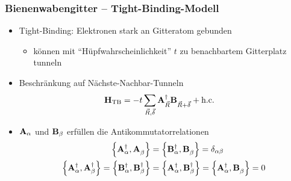 \begin{frame}
    \frametitle{Bienenwabengitter -- Tight-Binding-Modell}
    \begin{itemize}
        \item Tight-Binding: Elektronen stark an Gitteratom gebunden
        \begin{itemize}
            \item[$\rightarrow$] können mit ``Hüpfwahrscheinlichkeit'' $t$ zu benachbartem Gitterplatz tunneln
        \end{itemize}
        \item Beschränkung auf Nächste-Nachbar-Tunneln 
        \begin{align*}
            \oH_{\text{TB}} &= -t \sum_{\vec{R}, \vdelta} \oad{\vec{R}} \ob{\vec{R}+\vdelta} + \hc
        \end{align*}
        \item $\mathbf{A}_{\alpha}$ und $\mathbf{B}_{\beta}$ erfüllen die Antikommutatorrelationen
        \begin{align*}
            \anticommute{\oad{\alpha}}{\oa{\beta}} &= \anticommute{\obd{\alpha}}{\ob{\beta}} = \delta_{\alpha \beta} \\
            \anticommute{\oad{\alpha}}{\oad{\beta}} = \anticommute{\obd{\alpha}}{\obd{\beta}} &= \anticommute{\oad{\alpha}}{\obd{\beta}} = \anticommute{\oad{\alpha}}{\ob{\beta}} = 0
        \end{align*}
    \end{itemize}
\end{frame}